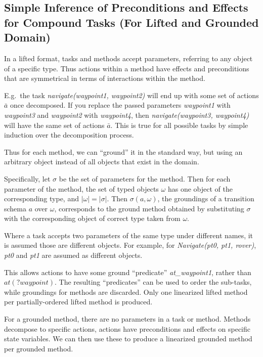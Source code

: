 \documentclass[letterpaper]{article} %
\begin{document}
 
\subsection{Simple Inference of Preconditions and Effects for Compound Tasks (For Lifted and Grounded Domain) }
In a lifted format, tasks and methods accept parameters, referring to any object of a specific type. Thus actions within a method have effects and preconditions that are symmetrical in terms of interactions within the method. 

E.g.\ the task \textit{navigate(waypoint1, waypoint2)} will end up with some set of actions  $\bar{a}$ once decomposed. If you replace the passed parameters \textit{waypoint1} with \textit{waypoint3} and \textit{waypoint2} with \textit{waypoint4}, then \textit{navigate(waypoint3, waypoint4)} will have the same set of actions $\bar{a}$. This is true for all possible tasks by simple induction over the decomposition process.

Thus for each method, we can \enquote{ground} it in the standard way, but using an arbitrary object instead of all objects that exist in the domain.

Specifically, let $\sigma$ be the set of parameters for the method. Then for each parameter of the method, the set of typed objects $\omega$ has one object of the corresponding type, and $|\omega| = |\sigma|$. Then $\sigma(a, \omega)$, the groundings of a transition schema $a$ over $\omega$, corresponds to the ground method obtained by substituting $\sigma$ with the corresponding object of correct type taken from $\omega$.

Where a task accepts two parameters of the same type under different names, it is assumed those are different objects. For example, for \textit{Navigate(pt0, pt1, rover)}, \textit{pt0} and \textit{pt1} are assumed as different objects. %

This allows actions to have some ground \enquote{predicate} \textit{at\_waypoint1}, rather than $at(?waypoint)$. The resulting \enquote{predicates} can be used to order the sub-tasks, while groundings for methods are discarded. Only one linearized lifted method per partially-ordered lifted method is produced.

For a grounded method, there are no parameters in a task or method. Methods decompose to specific actions, actions have preconditions and effects on specific state variables. We can then use these to produce a linearized grounded method per grounded method.
\end{document}
